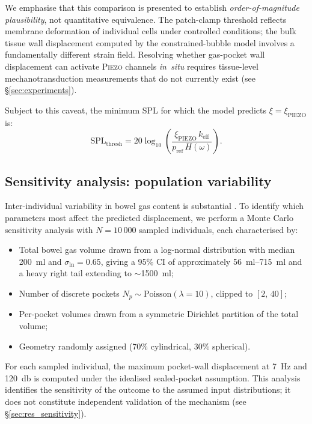 \documentclass[12pt]{article}
\newcommand{\piezo}{\textsc{Piezo}}
\begin{document}
We emphasise that this comparison is presented to establish
\emph{order-of-magnitude plausibility}, not quantitative equivalence.
The patch-clamp threshold reflects membrane deformation of individual cells
under controlled conditions; the bulk tissue wall displacement computed by
the constrained-bubble model involves a fundamentally different strain
field.  Resolving whether gas-pocket wall displacement can activate
\piezo{} channels \emph{in~situ} requires tissue-level mechanotransduction
measurements that do not currently exist (see \S\ref{sec:experiments}).

Subject to this caveat, the minimum SPL for which the model predicts
$\xi = \xi_\text{PIEZO}$ is:
\begin{equation}
  \text{SPL}_\text{thresh} = 20\log_{10}\!\left(
    \frac{\xi_\text{PIEZO}\,k_\text{eff}}{p_\text{ref}\,H(\omega)}
  \right).
  \label{eq:spl_threshold}
\end{equation}


\subsection{Sensitivity analysis: population variability}
\label{sec:montecarlo}

Inter-individual variability in bowel gas content is substantial
\citep{Levitt1971,Bedell1956,Serra2001}.  To identify which parameters
most affect the predicted displacement, we perform a Monte Carlo
sensitivity analysis with $N = 10\,000$ sampled individuals, each
characterised by:
\begin{itemize}
  \item Total bowel gas volume drawn from a log-normal distribution with
        median \SI{200}{\milli\litre} and $\sigma_{\ln} = 0.65$, giving a
        95\% CI of approximately \SIrange{56}{715}{\milli\litre} and a
        heavy right tail extending to $\sim$\SI{1500}{\milli\litre};
  \item Number of discrete pockets $N_p \sim \text{Poisson}(\lambda=10)$,
        clipped to $[2,\,40]$;
  \item Per-pocket volumes drawn from a symmetric Dirichlet partition of the
        total volume;
  \item Geometry randomly assigned (70\% cylindrical, 30\% spherical).
\end{itemize}

For each sampled individual, the maximum pocket-wall displacement at
\SI{7}{\hertz} and \SI{120}{\decibel} is computed under the idealised
sealed-pocket assumption.  This analysis identifies the sensitivity of the
outcome to the assumed input distributions; it does not constitute
independent validation of the mechanism (see \S\ref{sec:res_sensitivity}).
\end{document}
